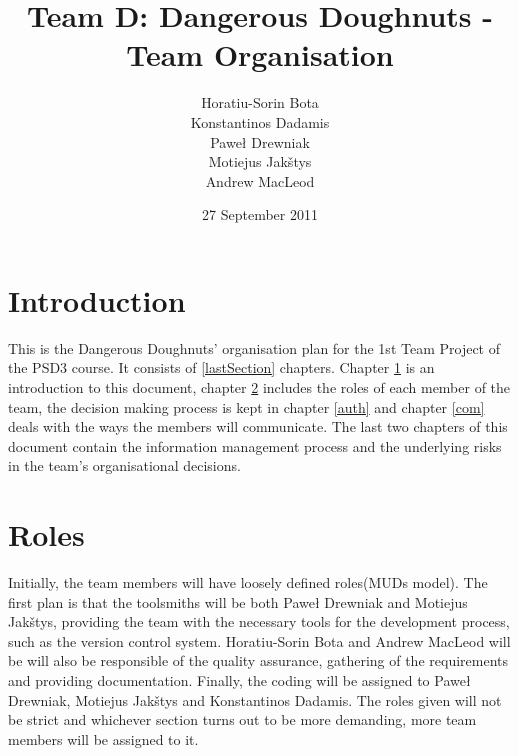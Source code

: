 \documentclass{article}
\begin{document}
\title{Team D: Dangerous Doughnuts - Team Organisation}
\author{Horatiu-Sorin Bota \\
		Konstantinos Dadamis \\
		Paweł Drewniak \\
		Motiejus Jakštys \\
		Andrew MacLeod}

\date{27 September 2011}
\maketitle

\section{Introduction}
\label{intro}

This is the Dangerous Doughnuts' organisation plan for the 1st Team
Project of the PSD3 course. It consists of \ref{lastSection}
chapters. Chapter \ref{intro} is an introduction to this document,
chapter \ref{role} includes the roles of each member of the team, the decision making process is kept in chapter \ref{auth} and chapter \ref{com} deals with the ways the members will communicate. The last two chapters of this document contain the information management process and the underlying risks in the team's organisational decisions.


\section{Roles}
\label{role}

Initially, the team members will have loosely defined roles(MUDs model). The first plan is that the toolsmiths will be both Paweł Drewniak and Motiejus Jakštys, providing the team with the necessary tools for the development process, such as the version control system. Horatiu-Sorin Bota and Andrew MacLeod will be will also be responsible of the quality assurance, gathering of the requirements and providing documentation. Finally, the coding will be assigned to Paweł Drewniak, Motiejus Jakštys and Konstantinos Dadamis. The roles given will not be strict and whichever section turns out to be more demanding, more team members will be assigned to it.  
\end{document}
